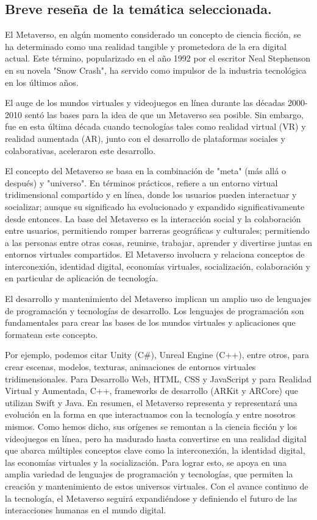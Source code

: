 \documentclass[a4paper,10pt]{article}
\begin{document}
		\subsection{Breve reseña de la temática seleccionada.}
	{\normalsize El Metaverso, en algún momento considerado un concepto de ciencia ficción, se ha determinado como una realidad tangible y prometedora de la era digital actual. Este término, popularizado en el año 1992 por el escritor Neal Stephenson en su novela "Snow Crash", ha servido como impulsor de la industria tecnológica en los últimos años.\par 
		El auge de los mundos virtuales y videojuegos en línea durante las décadas 2000-2010 sentó las bases para la idea de que un Metaverso sea posible. Sin embargo, fue en esta última década cuando tecnologías tales como realidad virtual (VR) y realidad aumentada (AR), junto con el desarrollo de plataformas sociales y colaborativas, aceleraron este desarrollo.\par 
		El concepto del Metaverso se basa en la combinación de "meta" (más allá o después) y "universo". En términos prácticos, refiere a un entorno virtual tridimensional compartido y en línea, donde los usuarios pueden interactuar y socializar; aunque su significado ha evolucionado y expandido significativamente desde entonces. La base del Metaverso es la interacción social y la colaboración entre usuarios, permitiendo romper barreras geográficas y culturales; permitiendo a las personas entre otras cosas, reunirse, trabajar, aprender y divertirse juntas en entornos virtuales compartidos. El Metaverso involucra y relaciona conceptos de interconexión, identidad digital, economías virtuales, socialización, colaboración y en particular de aplicación de tecnología.\par 
		El desarrollo y mantenimiento del Metaverso implican un amplio uso de lenguajes de programación y tecnologías de desarrollo. Los lenguajes de programación son fundamentales para crear las bases de los mundos virtuales y aplicaciones que formatean este concepto.\par 
		Por ejemplo, podemos citar Unity (C\#), Unreal Engine (C++), entre otros, para crear escenas, modelos, texturas, animaciones de entornos virtuales tridimensionales. Para Desarrollo Web, HTML, CSS y JavaScript y para Realidad Virtual y Aumentada, C++, frameworks de desarrollo (ARKit y ARCore) que utilizan Swift y Java.
		En resumen, el Metaverso representa y representará una evolución en la forma en que interactuamos con la tecnología y entre nosotros mismos. Como hemos dicho, sus orígenes se remontan a la ciencia ficción y los videojuegos en línea, pero ha madurado hasta convertirse en una realidad digital que abarca múltiples conceptos clave como la interconexión, la identidad digital, las economías virtuales y la socialización. Para lograr esto, se apoya en una amplia variedad de lenguajes de programación y tecnologías, que permiten la creación y mantenimiento de estos universos virtuales. Con el avance continuo de la tecnología, el Metaverso seguirá expandiéndose y definiendo el futuro de las interacciones humanas en el mundo digital.}
\end{document}
